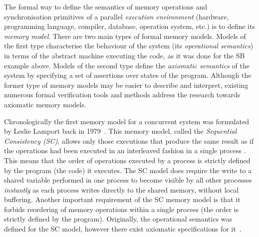 The formal way to define the semantics of memory operations and synchronisation primitives of a parallel \textit{execution environment} (hardware, programming language, compiler, database, operation system, etc.) is to define its \textit{memory model}.
There are two main types of formal memory models.
Models of the first type characterise the behaviour of the system (its \textit{operational semantics}) in terms of the abstract machine executing the code, as it was done for the SB example above.
Models of the second type define the \textit{axiomatic semantics} of the system by specifying a set of assertions over states of the program.
Although the former type of memory models may be easier to describe and interpret, existing numerous formal verification tools and methods address the research towards axiomatic memory models.

Chronologically the first memory model for a concurrent system was formulated by Leslie Lamport back in 1979~\cite{lamport1979make}.
This memory model, called the \textit{Sequential Consistency (SC)}, allows only those executions that produce the same result as if the operations had been executed in an interleaved fashion in a single process%
%
. %
%
This means that the order of operations executed by a process is strictly defined by the program (the code) it executes.
The SC model does require the write to a shared variable performed in one process to become visible by all other processes \textit{instantly} as each process writes directly to the shared memory, without local buffering.
Another important requirement of the SC memory model is that it forbids reordering of memory operations within a single process (the order is strictly defined by the program).
Originally, the operational semantics was defined for the SC model, however there exist axiomatic specifications for it~\cite{mansky2015axiomatic}.

